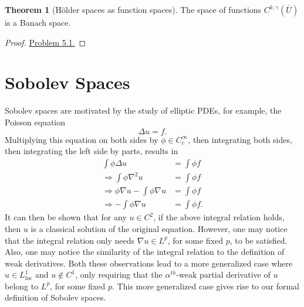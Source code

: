 \documentclass[11pt]{article}
\theoremstyle{definition}
\newtheorem*{theorem}{Theorem}
\begin{document}
\begin{theorem}[H\"{o}lder spaces as function spaces]
The space of functions $C^{k,\gamma}(\overline{U})$ is a Banach space.
\end{theorem}
\begin{proof}
\href{https://github.com/Aidenwjt/some-math-notes/blob/master/exercises/evans/exercises.pdf}{Problem 5.1.}
\end{proof}



\newpage

\section{Sobolev Spaces}
Sobolev spaces are motivated by the study of elliptic PDEs, for example, the Poisson equation
\[\Delta{u} = f.\]
Multiplying this equation on both sides by $\phi \in C_{c}^{\infty}$, then integrating both sides, then integrating the left side by parts, results in
\begin{equation*}
	\begin{aligned}
		\int \phi \Delta u &= \int \phi f \\
		\Rightarrow \int \phi \nabla^2 u &= \int \phi f \\
		\Rightarrow \phi \nabla u - \int \phi \nabla u &= \int \phi f \\ 
		\Rightarrow - \int \phi \nabla u &= \int \phi f.
	\end{aligned}
\end{equation*}
It can then be shown that for any $u \in C^2$, if the above integral relation holds, then $u$ is a classical solution of the original equation.
However, one may notice that the integral relation only needs $\nabla u \in L^p$, for some fixed $p$, to be satisfied.
Also, one may notice the similarity of the integral relation to the definition of weak derivatives. Both these observations lead to a more generalized
case where $u \in L^1_{\text{loc}}$ and $u \not\in C^1$, only requiring that the $\alpha^{th}$-weak partial derivative of $u$ belong to $L^p$, for some fixed $p$.
This more generalized case gives rise to our formal definition of Sobolev spaces.
\end{document}
